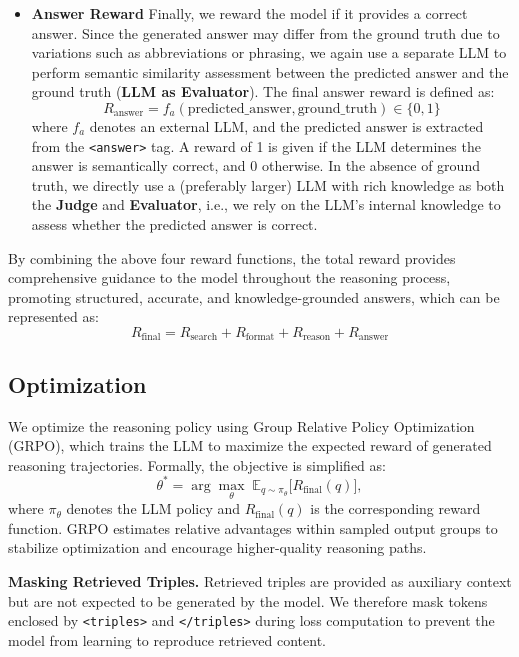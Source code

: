 \documentclass[10pt,conference]{IEEEtran}
\begin{document}
\begin{itemize}[leftmargin=1.5em]
\item \textbf{Answer Reward}
Finally, we reward the model if it provides a correct answer. Since the generated answer may differ from the ground truth due to variations such as abbreviations or phrasing, we again use a separate LLM to perform semantic similarity assessment between the predicted answer and the ground truth (\textbf{LLM as Evaluator}). The final answer reward is defined as:
\begin{equation}
R_{\text{answer}} = f_a(\text{predicted\_answer}, \text{ground\_truth}) \in \{0, 1\}
\label{eq:answer}
\end{equation}
where $f_a$ denotes an external LLM, and the predicted answer is extracted from the \texttt{<answer>} tag. A reward of 1 is given if the LLM determines the answer is semantically correct, and 0 otherwise.
In the absence of ground truth, we directly use a (preferably larger) LLM with rich knowledge as both the \textbf{Judge} and \textbf{Evaluator}, i.e., we rely on the LLM’s internal knowledge to assess whether the predicted answer is correct.
\end{itemize}
By combining the above four reward functions, the total reward provides comprehensive guidance to the model throughout the reasoning process, promoting structured, accurate, and knowledge-grounded answers, which can be represented as:
\begin{equation}
R_{\text{final}} = R_{\text{search}} + R_{\text{format}} + R_{\text{reason}} + R_{\text{answer}}  
\end{equation}

\subsection{Optimization}

We optimize the reasoning policy using Group Relative Policy Optimization (GRPO), which trains the LLM to maximize the expected reward of generated reasoning trajectories. Formally, the objective is simplified as:
\begin{equation}
\theta^{*} = \arg\max_{\theta} \; \mathbb{E}_{q \sim \pi_{\theta}} 
\big[ R_{\text{final}}(q) \big],
\end{equation}
where $\pi_{\theta}$ denotes the LLM policy and $R_{\text{final}}(q)$ is the corresponding reward function. GRPO estimates relative advantages within sampled output groups to stabilize optimization and encourage higher-quality reasoning paths.

\textbf{Masking Retrieved Triples.}
Retrieved triples are provided as auxiliary context but are not expected to be generated by the model. We therefore mask tokens enclosed by \texttt{<triples>} and \texttt{</triples>} during loss computation to prevent the model from learning to reproduce retrieved content.
\end{document}
